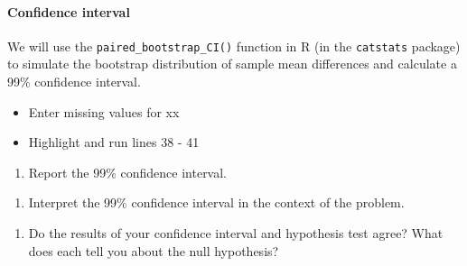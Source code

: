 \documentclass[
]{report}
\newenvironment{Shaded}{\begin{snugshade}}{\end{snugshade}}
\newcommand{\AttributeTok}[1]{\textcolor[rgb]{0.13,0.29,0.53}{#1}}
\newcommand{\CommentTok}[1]{\textcolor[rgb]{0.56,0.35,0.01}{\textit{#1}}}
\newcommand{\DecValTok}[1]{\textcolor[rgb]{0.00,0.00,0.81}{#1}}
\newcommand{\FunctionTok}[1]{\textcolor[rgb]{0.13,0.29,0.53}{\textbf{#1}}}
\newcommand{\NormalTok}[1]{#1}
\newcommand{\SpecialCharTok}[1]{\textcolor[rgb]{0.81,0.36,0.00}{\textbf{#1}}}
\providecommand{\tightlist}{%
  \setlength{\itemsep}{0pt}\setlength{\parskip}{0pt}}
\begin{document}
\paragraph*{Confidence interval}\label{confidence-interval-4}

We will use the \texttt{paired\_bootstrap\_CI()} function in R (in the \texttt{catstats} package) to simulate the bootstrap distribution of sample mean differences and calculate a 99\% confidence interval.

\begin{itemize}
\item
  Enter missing values for xx
\item
  Highlight and run lines 38 - 41
\end{itemize}

\begin{Shaded}
\end{Shaded}

\begin{enumerate}
\def\labelenumi{\arabic{enumi}.}
\setcounter{enumi}{7}
\tightlist
\item
  Report the 99\% confidence interval.
\end{enumerate}

\vspace{0.2in}

\begin{enumerate}
\def\labelenumi{\arabic{enumi}.}
\setcounter{enumi}{8}
\tightlist
\item
  Interpret the 99\% confidence interval in the context of the problem.
\end{enumerate}

\vspace{0.7in}

\begin{enumerate}
\def\labelenumi{\arabic{enumi}.}
\setcounter{enumi}{9}
\tightlist
\item
  Do the results of your confidence interval and hypothesis test agree? What does each tell you about the null hypothesis?
\end{enumerate}
\end{document}
